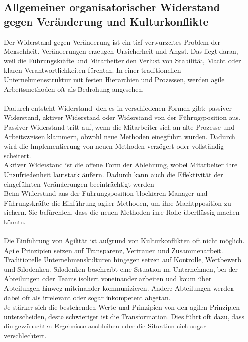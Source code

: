 \documentclass[ngerman]{seminarvorlage}
\begin{document}
\subsection{Allgemeiner organisatorischer Widerstand gegen Veränderung und Kulturkonflikte}
Der Widerstand gegen Veränderung ist ein tief verwurzeltes Problem der Menschheit. Veränderungen erzeugen Unsicherheit und Angst. Das liegt daran, weil die Führungskräfte und Mitarbeiter den Verlust von Stabilität, Macht oder klaren Verantwortlichkeiten fürchten. In einer traditionellen Unternehmensstruktur mit festen Hierarchien und Prozessen, werden agile Arbeitsmethoden oft als Bedrohung angesehen.\\\\ Dadurch entsteht Widerstand, den es in verschiedenen Formen gibt: passiver Widerstand, aktiver Widerstand oder Widerstand von der Führugsposition aus.\\ Passiver Widerstand tritt auf, wenn die Mitarbeiter sich an alte Prozesse und Arbeitsweisen klammern, obwohl neue Methoden einegführt wurden. Dadurch wird die Implementierung von neuen Methoden verzögert oder vollständig scheitert.\\ Aktiver Widerstand ist die offene Form der Ablehnung, wobei Mitarbeiter ihre Unzufriedenheit lautstark äußern. Dadurch kann auch die Effektivität der eingeführten Veränderungen beeinträchtigt werden. \\Beim Widerstand aus der Führungsposition blockieren Manager und Führungskräfte die Einführung agiler Methoden, um ihre Machtpposition zu sichern. Sie befürchten, dass die neuen Methoden ihre Rolle überflüssig machen könnte.\\\\
Die Einführung von Agilität ist aufgrund von Kulturkonflikten oft nicht möglich. Agile Prinzipien setzen auf Transparenz, Vertrauen und Zusammenarbeit. Traditionelle Unternehmenskulturen hingegen setzen auf Kontrolle, Wettbewerb und Silodenken. Silodenken beschreibt eine Situation im Unternehmen, bei der Abteilungen oder Teams isoliert voneinander arbeiten und kaum über Abteilungen hinweg miteinander kommunizieren. Andere Abteilungen werden dabei oft als irrelevant oder sogar inkompetent abgetan.\\ Je stärker sich die bestehenden Werte und Prinzipien von den agilen Prinzipien unterscheiden, desto schwieriger ist die Transformation. Dies führt oft dazu, dass die gewünschten Ergebnisse ausbleiben oder die Situation sich sogar verschlechtert.\\\\
\end{document}
